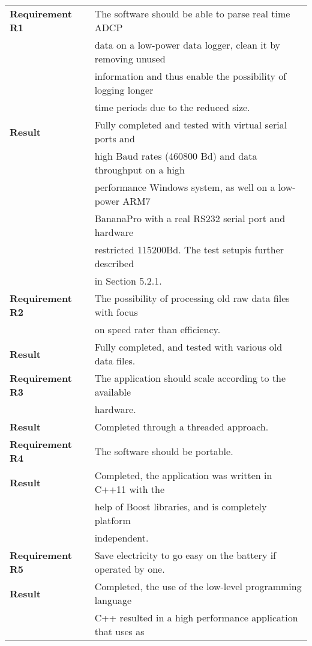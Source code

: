 \begin{tabular}{|l|l|}
  \hline
  	\textbf{Requirement R1} 
  	& The software should be able to parse real time ADCP\\ 
  	& data on a low-power data logger, clean it by removing unused\\
  	& information and thus enable the possibility of logging longer\\
  	& time periods due to the reduced size.\\ \hline
  	\textbf{Result} 
  	& Fully completed and tested with virtual serial ports and\\ 
  	& high Baud rates (460800 Bd) and data throughput on a high \\ 
  	& performance Windows system, as well on a low-power ARM7 \\ 
  	& BananaPro with a real RS232 serial port and hardware \\ 
  	& restricted 115200Bd. The test setupis further described \\
  	& in Section 5.2.1.\\
  \hline
  \hline
  	\textbf{Requirement R2} 
  	& The possibility of processing old raw data files with focus\\
  	& on speed rater than efficiency.\\ \hline
  	\textbf{Result} 
  	& Fully completed, and tested with various old data files.\\
  \hline
  \hline
  	\textbf{Requirement R3} 
  	& The application should scale according to the available\\
  	& hardware.\\ \hline
  	\textbf{Result} & Completed through a threaded approach.\\
  \hline
  \hline
  	\textbf{Requirement R4} 
  	& The software should be portable. \\ \hline
  	\textbf{Result} 
  	& Completed, the application was written in C++11 with the\\
  	& help of Boost libraries, and is completely platform\\
  	& independent.\\
  \hline
  \hline
  	\textbf{Requirement R5} 
  	& Save electricity to go easy on the battery if operated by one.\\ \hline
  	\textbf{Result} 
  	& Completed, the use of the low-level programming language\\
  	& C++ resulted in a high performance application that uses as\\

\end{tabular}
